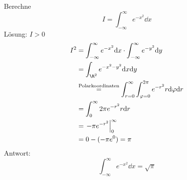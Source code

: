 \begin{bsp*}
	Berechne
	\[ I = \int_{-\infty}^\infty e^{-x^2} \dd x \]
	Lösung: $I > 0$
	\[ \begin{split}
		I^2
			&= \int_{-\infty}^\infty e^{-x^2} \dd x \cdot \int_{-\infty}^\infty e^{-y^2} \dd y \\
			&= \int_{\R^2} e^{-x^2 -y^2} \dd x \dd y \\
			&\overset{\text{\scriptsize{Polarkoordinaten}}}{=} \int_{r=0}^\infty \int_{\varphi=0}^{2\pi} e^{-r^2} r \dd \varphi \dd r \\
			&= \int_0^\infty 2\pi e^{-r^2} r \dd r \\
			&= \left. -\pi e^{-r^2} \right|_0^\infty \\
			&= 0 - (-\pi e^0) = \pi
	\end{split} \]
	Antwort:
	\[ \int_{-\infty}^\infty e^{-x^2} \dd x = \sqrt{\pi} \]
\end{bsp*}

